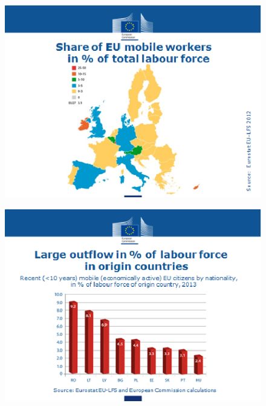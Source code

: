 \documentclass{beamer}
\begin{document}
\begin{frame}
  \begin{figure}
    \includegraphics[scale=.7]{eu_labour2.eps}
  \end{figure}
\end{frame}

\begin{frame}
  \begin{figure}
    \includegraphics[scale=.7]{eu_labour3.eps}
  \end{figure}
\end{frame}
\end{document}
